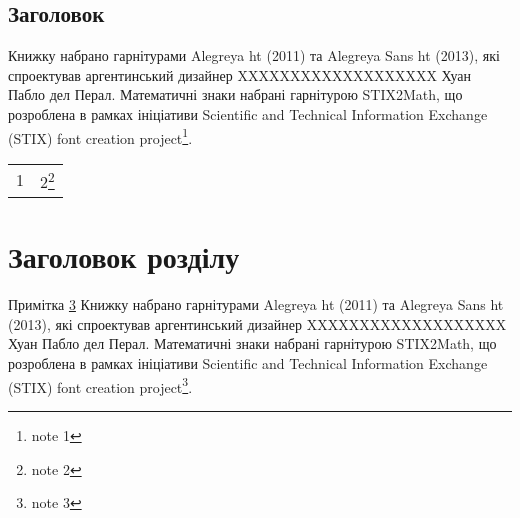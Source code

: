 \documentclass{kapital}
\begin{document}
\subsection[Заголовок]{Заголовок\footnotemark{}}

Книжку набрано гарнітурами Alegreya ht (2011) та Alegreya Sans ht (2013), які спроектував аргентинський дизайнер XXXXXXXXXXXXXXXXXXX Хуан Пабло дел Перал. Математичні знаки набрані гарнітурою STIX2Math, що розроблена в рамках ініціативи Scientific and Technical Information Exchange (STIX) font creation project\footnote{note 1}. 

\begin{tabularx}{10em}{Xl}
1 & 2\footnote{note 2}
\end{tabularx}

\section{Заголовок розділу}
Примітка \ref{footnote_1} Книжку набрано гарнітурами Alegreya ht (2011) та Alegreya Sans ht (2013), які спроектував аргентинський дизайнер XXXXXXXXXXXXXXXXXXX Хуан Пабло дел Перал. Математичні знаки набрані гарнітурою STIX2Math, що розроблена в рамках ініціативи Scientific and Technical Information Exchange (STIX) font creation project\footnote{\label{footnote_1}note 3}. 


\end{document}
